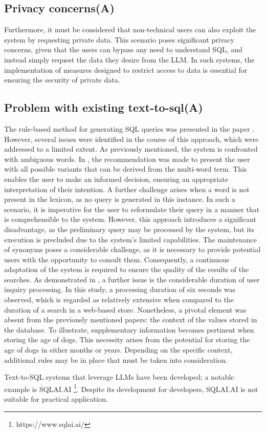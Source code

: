 \documentclass[../../submission.tex]{subfiles}
\begin{document}
\subsection{Privacy concerns(A)}
Furthermore, it must be considered that non-technical users can also exploit the system by requesting private data. 
This scenario poses significant privacy concerns, given that the users can bypass any need to understand SQL, and instead simply request the data they desire from the LLM. 
In such systems, the implementation of measures designed to restrict access to data is essential for ensuring the security of private data.


\subsection{Problem with existing text-to-sql(A)}
The rule-based method for generating SQL queries was presented in the paper  \cite{popescuEtalTowardsTheoryOfNaturalLanguage}. 
However, several issues were identified in the course of this approach, which were addressed to a limited extent. 
As previously mentioned, the system is confronted with ambiguous words. 
In  \cite{popescuEtalTowardsTheoryOfNaturalLanguage}, the recommendation was made to present the user with all possible variants that can be derived from the multi-word term.  
This enables the user to make an informed decision, ensuring an appropriate interpretation of their intention. 
A further challenge arises when a word is not present in the lexicon, as no query is generated in this instance. 
In such a scenario, it is imperative for the user to reformulate their query in a manner that is comprehensible to the system. 
However, this approach introduces a significant disadvantage, as the preliminary query may be processed by the system, but its execution is precluded due to the system's limited capabilities. 
The maintenance of synonyms poses a considerable challenge, as it is necessary to provide potential users with the opportunity to consult them. Consequently, a continuous adaptation of the system is required to ensure the quality of the results of the searches. 
As demonstrated in \cite{popescuEtalTowardsTheoryOfNaturalLanguage}, a further issue is the considerable duration of user inquiry processing. In this study, a processing duration of six seconds was observed, which is regarded as relatively extensive when compared to the duration of a search in a web-based store.
Nonetheless, a pivotal element was absent from the previously mentioned papers: the context of the values stored in the database. 
To illustrate, supplementary information becomes pertinent when storing the age of dogs. 
This necessity arises from the potential for storing the age of dogs in either months or years. 
Depending on the specific context, additional rules may be in place that must be taken into consideration. 

Text-to-SQL systems that leverage LLMs have been developed; a notable example is SQLAI.AI \footnote{https://www.sqlai.ai/}. 
Despite its development for developers, SQLAI.AI is not suitable for practical application.
\end{document}
